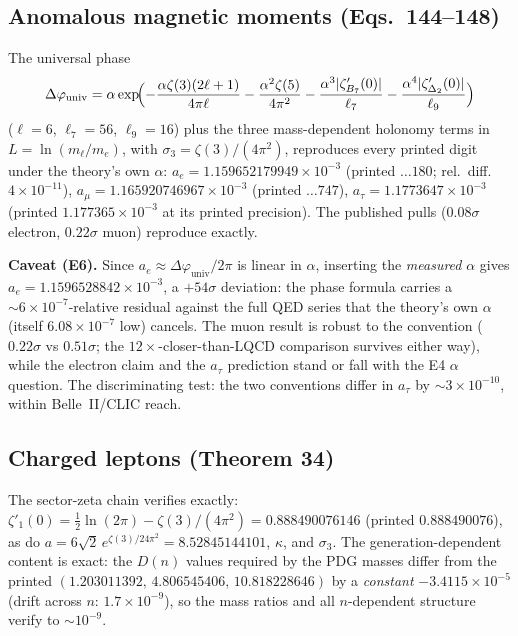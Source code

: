 \documentclass[11pt,letterpaper]{article}
\newcommand{\zetaP}{\zeta'}
\begin{document}
\subsection{Anomalous magnetic moments (Eqs.~144--148)}
\label{sec:g2}

The universal phase
\begin{equation}
\Delta\varphi_{\mathrm{univ}}=\alpha\exp\!\Bigl(
-\frac{\alpha\zeta(3)(2\ell+1)}{4\pi\ell}
-\frac{\alpha^2\zeta(5)}{4\pi^2}
-\frac{\alpha^3|\zetaP_{B_7}(0)|}{\ell_7}
-\frac{\alpha^4|\zetaP_{\Delta_2}(0)|}{\ell_9}\Bigr)
\end{equation}
($\ell=6$, $\ell_7=56$, $\ell_9=16$) plus the three mass-dependent holonomy
terms in $L=\ln(m_\ell/m_e)$, with $\sigma_3=\zeta(3)/(4\pi^2)$, reproduces
every printed digit under the theory's own $\alpha$:
$a_e=1.159652179949\times10^{-3}$ (printed $\ldots180$; rel.\ diff.\
$4\times10^{-11}$), $a_\mu=1.165920746967\times10^{-3}$ (printed
$\ldots747$), $a_\tau=1.1773647\times10^{-3}$ (printed $1.177365\times10^{-3}$
at its printed precision). The published pulls ($0.08\sigma$ electron,
$0.22\sigma$ muon) reproduce exactly.

\textbf{Caveat (E6).} Since $a_e\approx\Delta\varphi_{\mathrm{univ}}/2\pi$ is
linear in $\alpha$, inserting the \emph{measured} $\alpha$ gives
$a_e=1.1596528842\times10^{-3}$, a $+54\sigma$ deviation: the phase formula
carries a $\sim6\times10^{-7}$-relative residual against the full QED series
that the theory's own $\alpha$ (itself $6.08\times10^{-7}$ low) cancels. The
muon result is robust to the convention ($0.22\sigma$ vs $0.51\sigma$; the
$12\times$-closer-than-LQCD comparison survives either way), while the
electron claim and the $a_\tau$ prediction stand or fall with the E4
$\alpha$ question. The discriminating test: the two conventions differ in
$a_\tau$ by $\sim3\times10^{-10}$, within Belle~II/CLIC reach.

\subsection{Charged leptons (Theorem 34)}
\label{sec:leptons}

The sector-zeta chain verifies exactly:
$\zetaP_1(0)=\tfrac12\ln(2\pi)-\zeta(3)/(4\pi^2)=0.888490076146$ (printed
$0.888490076$), as do $a=6\sqrt2\,e^{\zeta(3)/24\pi^2}=8.52845144101$, $\kappa$,
and $\sigma_3$. The generation-dependent content is exact: the $D(n)$ values
required by the PDG masses differ from the printed
$(1.203011392,\,4.806545406,\,10.818228646)$ by a \emph{constant}
$-3.4115\times10^{-5}$ (drift across $n$: $1.7\times10^{-9}$), so the mass
ratios and all $n$-dependent structure verify to $\sim10^{-9}$.
\end{document}
